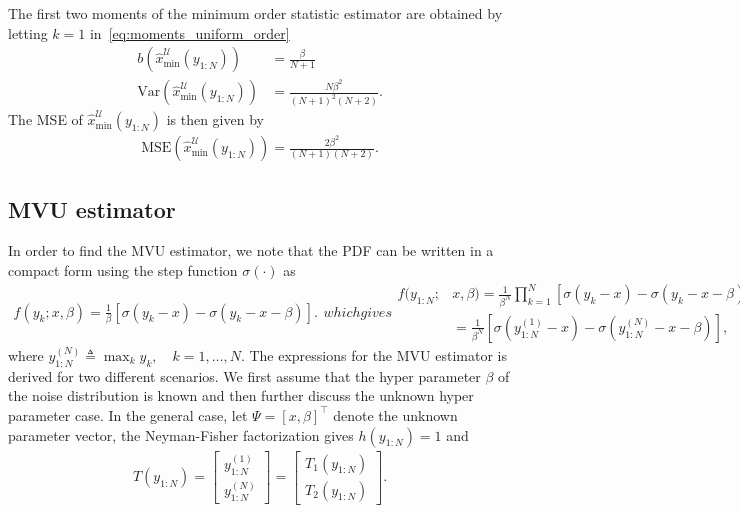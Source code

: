 \documentclass{article}
\newcommand{\Var}{\mathrm{Var}}
\newcommand{\MSE}{\mathrm{MSE}}
\begin{document}
%
%
The first two moments of the minimum order statistic estimator are obtained by letting $k=1$ in~\eqref{eq:moments_uniform_order}
%
%
\begin{subequations}\label{eq:moments_uniform_min}
	\begin{align}
	b\left(\hat{x}_{\mathrm{min}}^{\mathcal{U}}(y_{1:N})\right) &= \frac{\beta}{N+1}\\
	\Var\left(\hat{x}_{\mathrm{min}}^{\mathcal{U}}(y_{1:N})\right) &= \frac{N\beta^2}{(N+1)^2(N+2)}.
	\end{align}
\end{subequations}
%
%
The MSE of $\hat{x}_{\mathrm{min}}^{\mathcal{U}}(y_{1:N})$ is then given by
%
%
\begin{align}
\MSE\left(\hat{x}_{\mathrm{min}}^{\mathcal{U}}(y_{1:N})\right) = \frac{2\beta^2}{(N+1)(N+2)}.
\label{eq:mse_min_uniform}
\end{align}
%
%
\subsection{MVU estimator}\label{subsec:mvu_estimator}
In order to find the MVU estimator, we note that the PDF can be written in a compact form using the step function $\sigma(\cdot)$ as
\begin{subequations}
	\begin{align}
	f(y_k;x,\beta) = \frac{1}{\beta}\left[\sigma(y_k-x) - \sigma(y_k-x-\beta)\right].
	\label{eq:uniform_pdf_single}
	\end{align}
	which gives
	\begin{align}
	f(y_{1:N};&x,\beta) = \frac{1}{\beta^N}\prod_{k=1}^{N}\left[\sigma(y_k-x) - \sigma(y_k-x-\beta)\right]\nonumber\\
	&=\frac{1}{\beta^N}\left[\sigma( y^{(1)}_{1:N} -x) - \sigma(y^{(N)}_{1:N}-x -\beta)\right],%
	\label{eq:unknown}
	\end{align}
\end{subequations}
%
%
where $y^{(N)}_{1:N}\triangleq\max_k y_k,\quad k=1,\ldots,N$.
The expressions for the MVU estimator is derived for two different scenarios. We first assume that the hyper parameter $\beta$ of the noise distribution is known and then further discuss the unknown hyper parameter case.  In the general case, let $\Psi = [x,\beta]^\top$ denote the unknown parameter vector, the Neyman-Fisher factorization gives $h(y_{1:N})=1$ and 
%
%
\begin{align}
T(y_{1:N}) = \begin{bmatrix}
y^{(1)}_{1:N} \\ y^{(N)}_{1:N}
\end{bmatrix} = \begin{bmatrix}
T_1(y_{1:N}) \\ T_2(y_{1:N})
\end{bmatrix}.
\label{eq:uniform_ss}
\end{align}
%
%
\end{document}
